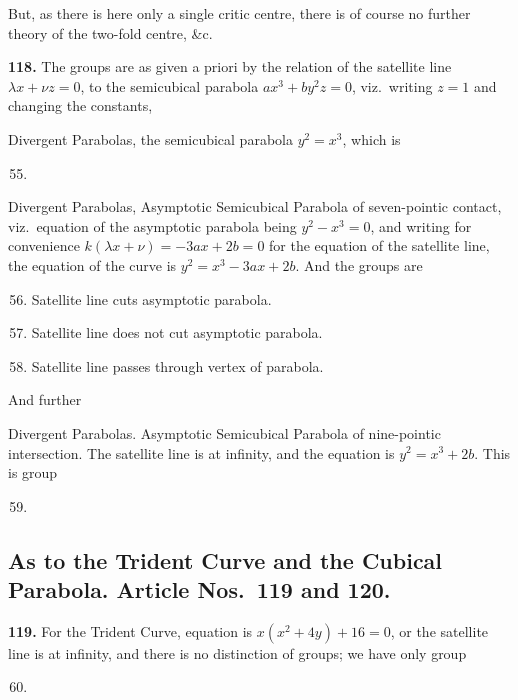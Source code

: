 \documentclass[11pt,a4paper]{article}
\theoremstyle{plain}
\begin{document}
But, as there is here only a single critic centre, there is of course no further theory of the two-fold centre, \&c.

\noindent\textbf{118.} The groups are as given a priori by the relation of the satellite line $\lambda x + \nu z = 0$, to the semicubical parabola $ax^3 + by^2z = 0$, viz.\ writing $z=1$ and changing the constants,

Divergent Parabolas, the semicubical parabola $y^2 = x^3$, which is
\begin{enumerate}[label=\textsc{\Roman*.},nosep]
\setcounter{enumi}{54}
\item
\end{enumerate}
Divergent Parabolas, Asymptotic Semicubical Parabola of seven-pointic contact, viz.\ equation of the asymptotic parabola being $y^2 - x^3 = 0$, and writing for convenience $k(\lambda x + \nu) = -3ax + 2b = 0$ for the equation of the satellite line, the equation of the curve is $y^2 = x^3 - 3ax + 2b$. And the groups are
\begin{enumerate}[label=\textsc{\Roman*.},nosep]
\setcounter{enumi}{55}
\item Satellite line cuts asymptotic parabola.
\item Satellite line does not cut asymptotic parabola.
\item Satellite line passes through vertex of parabola.
\end{enumerate}

And further

Divergent Parabolas. Asymptotic Semicubical Parabola of nine-pointic intersection. The satellite line is at infinity, and the equation is $y^2 = x^3 + 2b$. This is group
\begin{enumerate}[label=\textsc{\Roman*.},nosep]
\setcounter{enumi}{58}
\item
\end{enumerate}

\subsection*{As to the Trident Curve and the Cubical Parabola. Article Nos.\ 119 and 120.}

\noindent\textbf{119.} For the Trident Curve, equation is $x(x^2 + 4y) + 16 = 0$, or the satellite line is at infinity, and there is no distinction of groups; we have only group
\begin{enumerate}[label=\textsc{\Roman*.},nosep]
\setcounter{enumi}{59}
\item
\end{enumerate}
\end{document}
